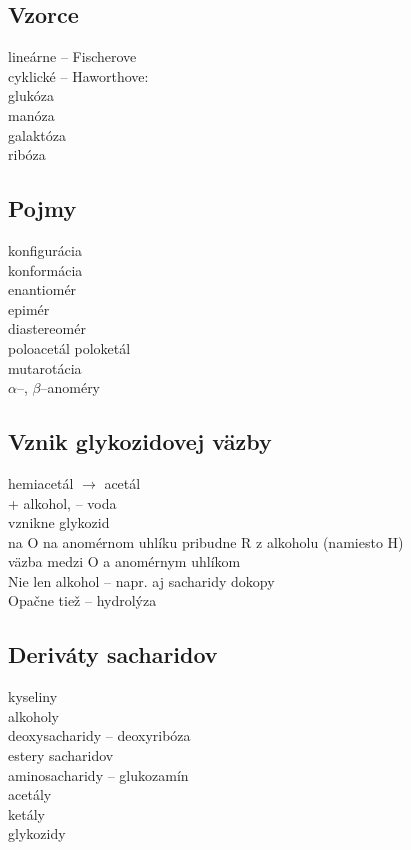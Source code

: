 \subsection*{Vzorce}
lineárne -- Fischerove\\
\tab cyklické -- Haworthove: \\
\tab glukóza\\
\tab manóza\\
\tab galaktóza\\
\tab ribóza\\
\subsection*{Pojmy}
\tab konfigurácia\\
\tab konformácia\\
\tab enantiomér\\
\tab epimér\\
\tab diastereomér\\
\tab poloacetál
\tab poloketál\\
\tab mutarotácia\\
\tab $\alpha$--, $\beta$--anoméry\\

\subsection*{Vznik glykozidovej väzby}
hemiacetál $\rightarrow$ acetál\\
+ alkohol, -- voda\\
vznikne glykozid\\
na O na anomérnom uhlíku pribudne R z alkoholu (namiesto H)\\
väzba medzi O a anomérnym uhlíkom\\
Nie len alkohol -- napr. aj sacharidy dokopy\\
Opačne tiež -- hydrolýza\\
\subsection*{Deriváty sacharidov}
\tab kyseliny\\
\tab alkoholy\\
\tab deoxysacharidy -- deoxyribóza\\
\tab estery sacharidov\\
\tab aminosacharidy -- glukozamín\\
\tab acetály\\
\tab ketály\\
\tab glykozidy\\
